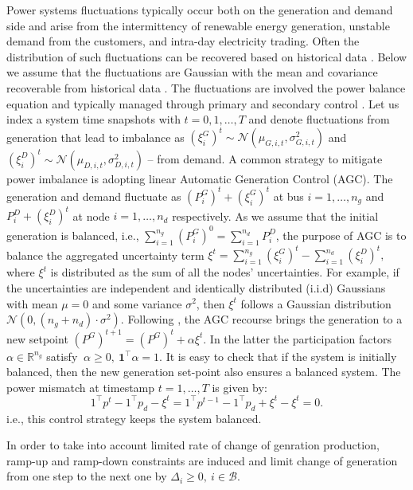 Power systems fluctuations typically occur both on the generation and demand side and arise from the intermittency of renewable energy generation, unstable demand from the customers, and intra-day electricity trading. Often the distribution of such fluctuations can be recovered based on historical data \cite{roald2017chance,owen2019importance}. 
Below we assume that the fluctuations are Gaussian with the mean and covariance recoverable from historical data \cite{anvari2016short,roald2017chance}. 
The fluctuations are involved the power balance equation and typically managed through primary and secondary control \cite{machowski2020power}.
Let us index a system time snapshots with $t = 0, 1, \dots, T$ and denote fluctuations from generation that lead to imbalance as $(\xi_i^G)^t \sim \mathcal{N}(\mu_{G, i, t}, \sigma^2_{G,i, t})$ and $(\xi_i^D)^t \sim \mathcal{N}(\mu_{D, i, t}, \sigma^2_{D, i, t})$ -- from demand.
A common strategy to mitigate power imbalance is adopting linear Automatic Generation Control (AGC). The generation and demand fluctuate as $(P_i^G)^t + (\xi_i^G)^t$ at bus $i=1, \dots, n_g$ and $P^D_i + (\xi_i^D)^t$ at node $i=1,\dots, n_d$ respectively. As we assume that the initial generation is balanced, i.e., $\sum_{i=1}^{n_g} (P^G_i)^0 = \sum_{i=1}^{n_d} P_i^D$, the purpose of AGC is to balance the aggregated uncertainty term $\xi^t = \sum_{i=1}^{n_g}(\xi^G_i)^t-\sum_{i=1}^{n_d}(\xi^D_i)^t,$ where $\xi^t$ is distributed as the sum of all the nodes' uncertainties. For example, if the uncertainties are independent and identically distributed (i.i.d) Gaussians with mean $\mu = 0$ and some variance $\sigma^2$, then $\xi^t$ follows a Gaussian distribution $\mathcal{N}\left(0, (n_g+n_d) \cdot \sigma^2 \right)$. Following \cite{roald2017chance,baros2021examining,mezghani2020stochastic},
the AGC recourse brings the generation to a new setpoint $(P^G)^{t+1} = (P^G)^t + \alpha \xi^t$. In the latter the participation factors $\alpha \in \mathbb{R}^{n_g}$ satisfy $~\alpha \geq 0, ~ \boldsymbol{1}^\top \alpha = 1$. It is easy to check that if the system is initially balanced, then the new generation set-point also ensures a balanced system. The power mismatch at timestamp $t=1, \dots, T$ is given by:
$$
    1^\top p^t - 1^\top p_d - \xi^t = 1^\top p^{t-1} - 1^\top p_d + \xi^t - \xi^t = 0.
    \label{eq:power-balance-agc}
$$
i.e., this control strategy keeps the system balanced. 

In order to take into account limited rate of change of genration production, ramp-up and ramp-down constraints are induced and limit change of generation from one step to the next one by $\Delta_i \geq 0, ~ i \in \mathcal{B}$. 

